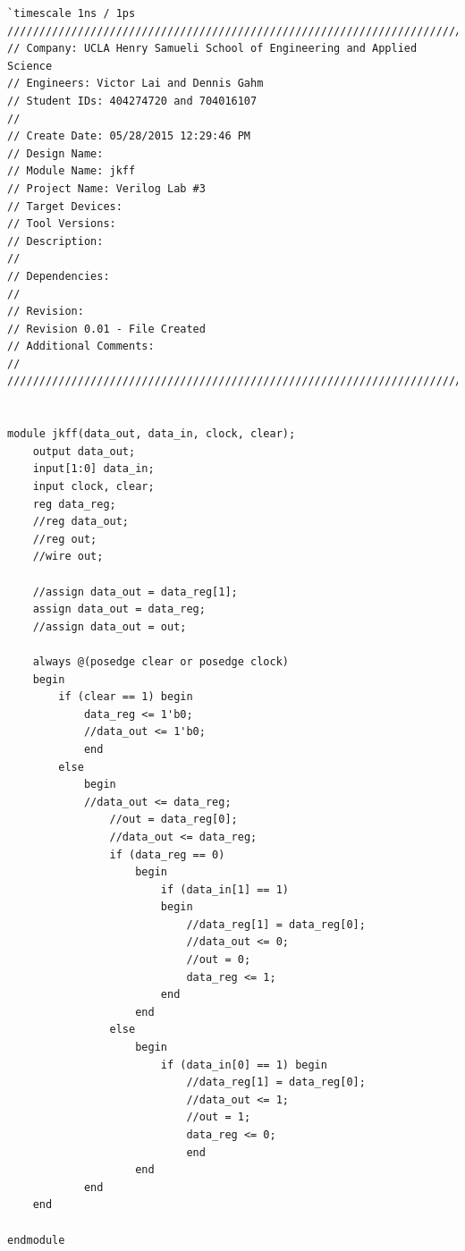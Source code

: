 \documentclass{article}
\begin{document}
\begin{verbatim}
`timescale 1ns / 1ps
/////////////////////////////////////////////////////////////////////////////
// Company: UCLA Henry Samueli School of Engineering and Applied Science
// Engineers: Victor Lai and Dennis Gahm
// Student IDs: 404274720 and 704016107
// 
// Create Date: 05/28/2015 12:29:46 PM
// Design Name: 
// Module Name: jkff
// Project Name: Verilog Lab #3
// Target Devices: 
// Tool Versions: 
// Description: 
// 
// Dependencies: 
// 
// Revision:
// Revision 0.01 - File Created
// Additional Comments:
// 
/////////////////////////////////////////////////////////////////////////////


module jkff(data_out, data_in, clock, clear);
    output data_out;
    input[1:0] data_in;
    input clock, clear;
    reg data_reg;
    //reg data_out;
    //reg out;
    //wire out;
    
    //assign data_out = data_reg[1];
    assign data_out = data_reg;
    //assign data_out = out;
    
    always @(posedge clear or posedge clock)
    begin
        if (clear == 1) begin
            data_reg <= 1'b0;
            //data_out <= 1'b0;
            end
        else
            begin
            //data_out <= data_reg;
                //out = data_reg[0];
                //data_out <= data_reg;
                if (data_reg == 0)
                    begin
                        if (data_in[1] == 1)
                        begin
                            //data_reg[1] = data_reg[0];
                            //data_out <= 0;
                            //out = 0;
                            data_reg <= 1;
                        end
                    end
                else
                    begin
                        if (data_in[0] == 1) begin
                            //data_reg[1] = data_reg[0];
                            //data_out <= 1;
                            //out = 1;
                            data_reg <= 0;
                            end
                    end
            end 
    end

endmodule
\end{verbatim}

\end{document}
